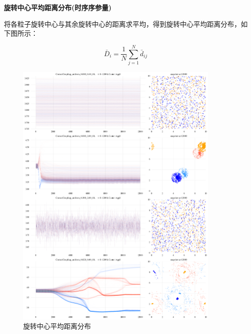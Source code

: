 \documentclass{article}
\begin{document}
\newpage
\noindent\textbf{旋转中心平均距离分布(时序序参量)}

将各粒子旋转中心与其余旋转中心的距离求平均，得到旋转中心平均距离分布，如下图所示：

$$
\bar{D}_i=\frac{1}{N}\sum_{j=1}^N{\bar{d}_{ij}}
$$

\begin{figure}[H]
	\centering
	\includegraphics[width=0.9\textwidth]{./figs/centerAgg1_ts.png}
	\vspace{-0.5cm}
	\caption{旋转中心平均距离分布}
	\label{fig:fig234t.6}
\end{figure}



\end{document}
